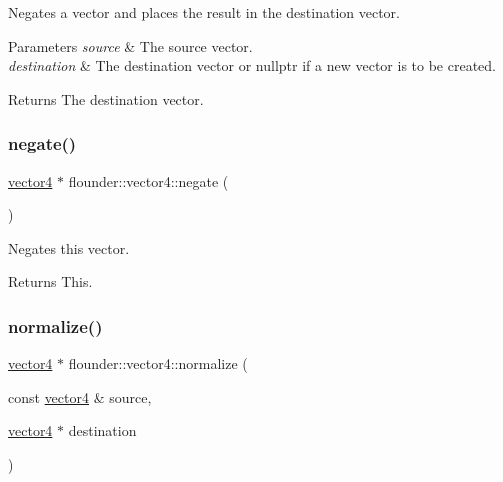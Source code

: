 Negates a vector and places the result in the destination vector. 


\begin{DoxyParams}{Parameters}
{\em source} & The source vector. \\
\hline
{\em destination} & The destination vector or nullptr if a new vector is to be created. \\
\hline
\end{DoxyParams}
\begin{DoxyReturn}{Returns}
The destination vector. 
\end{DoxyReturn}
\mbox{\label{classflounder_1_1vector4_a024aa43916f5c77623010019e31c5791}} 
\subsubsection{\texorpdfstring{negate()}{negate()}\hspace{0.1cm}{\footnotesize\ttfamily [2/2]}}
{\footnotesize\ttfamily \hyperlink{classflounder_1_1vector4}{vector4} $\ast$ flounder\+::vector4\+::negate (\begin{DoxyParamCaption}{ }\end{DoxyParamCaption})}



Negates this vector. 

\begin{DoxyReturn}{Returns}
This. 
\end{DoxyReturn}
\mbox{\label{classflounder_1_1vector4_a9e6b492a08b3e69b63badb88dada1129}} 
\subsubsection{\texorpdfstring{normalize()}{normalize()}\hspace{0.1cm}{\footnotesize\ttfamily [1/2]}}
{\footnotesize\ttfamily \hyperlink{classflounder_1_1vector4}{vector4} $\ast$ flounder\+::vector4\+::normalize (\begin{DoxyParamCaption}\item[{const \hyperlink{classflounder_1_1vector4}{vector4} \&}]{source,  }\item[{\hyperlink{classflounder_1_1vector4}{vector4} $\ast$}]{destination }\end{DoxyParamCaption})\hspace{0.3cm}{\ttfamily [static]}}



